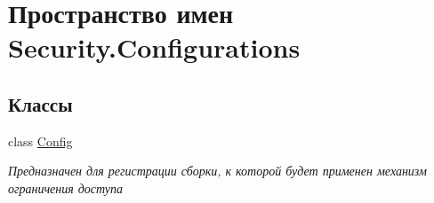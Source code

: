 \hypertarget{namespace_security_1_1_configurations}{}\section{Пространство имен Security.\+Configurations}
\label{namespace_security_1_1_configurations}
\subsection*{Классы}
\begin{DoxyCompactItemize}
\item 
class \hyperlink{class_security_1_1_configurations_1_1_config}{Config}
\begin{DoxyCompactList}\small\item\em Предназначен для регистрации сборки, к которой будет применен механизм ограничения доступа \end{DoxyCompactList}\end{DoxyCompactItemize}
